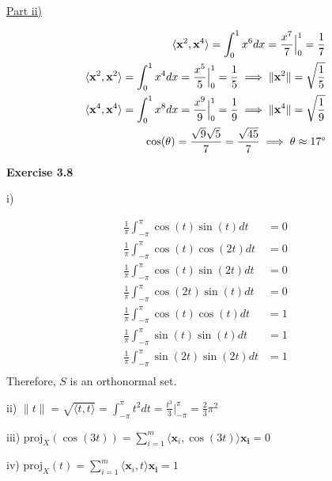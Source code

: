 \documentclass[letterpaper,12pt]{article}
\newcommand{\vect}[1]{\mathbf{#1}}
\begin{document}
\underline{Part ii)}

\begin{align*}
  \langle \vect{x}^2, \vect{x}^4 \rangle = \int_0^1 x^6 dx = \frac{x^7}{7} \Big|_0^1 = \frac{1}{7} \\
  \langle \vect{x}^2, \vect{x}^2 \rangle = \int_0^1 x^4 dx = \frac{x^5}{5} \Big|_0^1 = \frac{1}{5} 
  \implies \|\vect{x}^2\| = \sqrt{\frac{1}{5}} \\
  \langle \vect{x}^4, \vect{x}^4 \rangle = \int_0^1 x^{8} dx = \frac{x^{9}}{9} \Big|_0^{1} = \frac{1}{9} \implies \|\vect{x}^4\| = \sqrt{\frac{1}{9}} \\  
  \cos(\theta) = \frac{\sqrt{9} \sqrt{5}}{7} = \frac{\sqrt{45}}{7}
  \implies \theta \approx 17 \degree
\end{align*}

\textbf{Exercise 3.8}

i)

\begin{align*}
\frac{1}{\pi} \int_{-\pi}^{\pi} \cos(t) \sin(t) dt &= 0    \\
\frac{1}{\pi} \int_{-\pi}^{\pi} \cos(t) \cos(2t) dt &= 0   \\
\frac{1}{\pi} \int_{-\pi}^{\pi} \cos(t) \sin(2t) dt &= 0   \\
\frac{1}{\pi} \int_{-\pi}^{\pi} \cos(2t) \sin(t) dt &= 0   \\
\frac{1}{\pi} \int_{-\pi}^{\pi} \cos(t) \cos(t) dt &= 1    \\
\frac{1}{\pi} \int_{-\pi}^{\pi} \sin(t) \sin(t) dt &= 1    \\
\frac{1}{\pi} \int_{-\pi}^{\pi} \sin(2t) \sin(2t) dt &= 1  \\
\end{align*}
Therefore, $S$ is an orthonormal set.

        
ii)
\begin{math}  
\|t\| = \sqrt{\langle t, t \rangle} = \int_{-\pi}^{\pi} t^2 dt
= \frac{t^3}{3} \Big|^\pi_{-\pi} = \frac{2}{3}\pi^2
\end{math}

iii)
\begin{math}
  \text{proj}_X(\cos(3t)) = \sum_{i=1}^m \langle \vect{x}_i, \cos(3t) \rangle 
  \vect{x_i} = 0
\end{math}

iv)
\begin{math}
  \text{proj}_X(t) = \sum_{i=1}^m \langle \vect{x}_i, t \rangle 
  \vect{x_i} = 1
\end{math}
\end{document}
